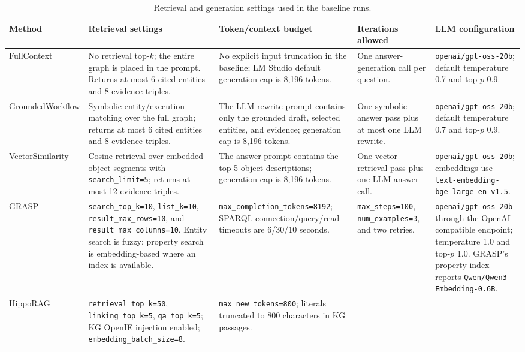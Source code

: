 \begin{table}[t]
\centering
\scriptsize
\caption{Retrieval and generation settings used in the baseline runs.}\label{tab:baseline-config-details}
\begin{tabular}{@{}p{}p{}p{}p{}p{}@{}}
\toprule
Method & Retrieval settings & Token/context budget & Iterations allowed & LLM configuration \\
\midrule
FullContext &
No retrieval top-\(k\); the entire graph is placed in the prompt. Returns at most 6 cited entities and 8 evidence triples. &
No explicit input truncation in the baseline; LM Studio default generation cap is 8,196 tokens. &
One answer-generation call per question. &
\texttt{openai/gpt-oss-20b}; default temperature 0.7 and top-\(p\) 0.9. \\
\addlinespace
GroundedWorkflow &
Symbolic entity/execution matching over the full graph; returns at most 6 cited entities and 8 evidence triples. &
The LLM rewrite prompt contains only the grounded draft, selected entities, and evidence; generation cap is 8,196 tokens. &
One symbolic answer pass plus at most one LLM rewrite. &
\texttt{openai/gpt-oss-20b}; default temperature 0.7 and top-\(p\) 0.9. \\
\addlinespace
VectorSimilarity &
Cosine retrieval over embedded object segments with \texttt{search\_limit=5}; returns at most 12 evidence triples. &
The answer prompt contains the top-5 object descriptions; generation cap is 8,196 tokens. &
One vector retrieval pass plus one LLM answer call. &
\texttt{openai/gpt-oss-20b}; embeddings use \texttt{text-embedding-bge-large-en-v1.5}. \\
\addlinespace
GRASP &
\texttt{search\_top\_k=10}, \texttt{list\_k=10}, \texttt{result\_max\_rows=10}, and \texttt{result\_max\_columns=10}. Entity search is fuzzy; property search is embedding-based where an index is available. &
\texttt{max\_completion\_tokens=8192}; SPARQL connection/query/read timeouts are 6/30/10 seconds. &
\texttt{max\_steps=100}, \texttt{num\_examples=3}, and two retries. &
\texttt{openai/gpt-oss-20b} through the OpenAI-compatible endpoint; temperature 1.0 and top-\(p\) 1.0. GRASP's property index reports \texttt{Qwen/Qwen3-Embedding-0.6B}. \\
\addlinespace
HippoRAG &
\texttt{retrieval\_top\_k=50}, \texttt{linking\_top\_k=5}, \texttt{qa\_top\_k=5}; KG OpenIE injection enabled; \texttt{embedding\_batch\_size=8}. &
\texttt{max\_new\_tokens=800}; literals truncated to 800 characters in KG passages. &

\end{tabular}
\end{table}
